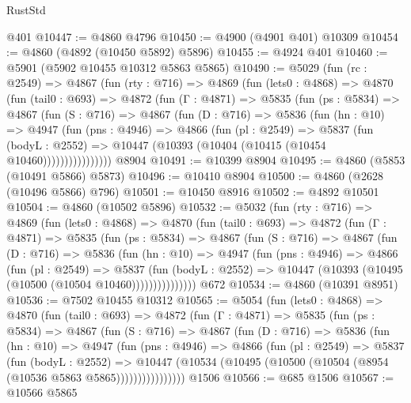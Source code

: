 \begin{lexlean}{RustStd}
\begin{coremodule}
    @401
@10447 := @4860 @4796
@10450 := @4900 (@4901 @401) @10309
@10454 := @4860 (@4892 (@10450 @5892) @5896)
@10455 := @4924 @401
@10460 := @5901 (@5902 @10455 @10312 @5863 @5865)
@10490 := @5029
    (fun (rc : @2549) =>
    @4867
      (fun (rty : @716) =>
      @4869
        (fun (lets0 : @4868) =>
        @4870
          (fun (tail0 : @693) =>
          @4872
            (fun (Γ : @4871) =>
            @5835
              (fun (ps : @5834) =>
              @4867
                (fun (S : @716) =>
                @4867
                  (fun (D : @716) =>
                  @5836
                    (fun (hn : @10) =>
                    @4947
                      (fun (pns : @4946) =>
                      @4866
                        (fun (pl : @2549) =>
                        @5837
                          (fun (bodyL : @2552) =>
                          @10447 (@10393 (@10404 (@10415 (@10454 @10460))))))))))))))))
    @8904
@10491 := @10399 @8904
@10495 := @4860 (@5853 (@10491 @5866) @5873)
@10496 := @10410 @8904
@10500 := @4860 (@2628 (@10496 @5866) @796)
@10501 := @10450 @8916
@10502 := @4892 @10501
@10504 := @4860 (@10502 @5896)
@10532 := @5032
    (fun (rty : @716) =>
    @4869
      (fun (lets0 : @4868) =>
      @4870
        (fun (tail0 : @693) =>
        @4872
          (fun (Γ : @4871) =>
          @5835
            (fun (ps : @5834) =>
            @4867
              (fun (S : @716) =>
              @4867
                (fun (D : @716) =>
                @5836
                  (fun (hn : @10) =>
                  @4947
                    (fun (pns : @4946) =>
                    @4866
                      (fun (pl : @2549) =>
                      @5837
                        (fun (bodyL : @2552) =>
                        @10447 (@10393 (@10495 (@10500 (@10504 @10460)))))))))))))))
    @672
@10534 := @4860 (@10391 @8951)
@10536 := @7502 @10455 @10312
@10565 := @5054
    (fun (lets0 : @4868) =>
    @4870
      (fun (tail0 : @693) =>
      @4872
        (fun (Γ : @4871) =>
        @5835
          (fun (ps : @5834) =>
          @4867
            (fun (S : @716) =>
            @4867
              (fun (D : @716) =>
              @5836
                (fun (hn : @10) =>
                @4947
                  (fun (pns : @4946) =>
                  @4866
                    (fun (pl : @2549) =>
                    @5837
                      (fun (bodyL : @2552) =>
                      @10447
                        (@10534 (@10495 (@10500 (@10504 (@8954 (@10536 @5863 @5865))))))))))))))))
    @1506
@10566 := @685 @1506
@10567 := @10566 @5865

\end{coremodule}
\end{lexlean}
